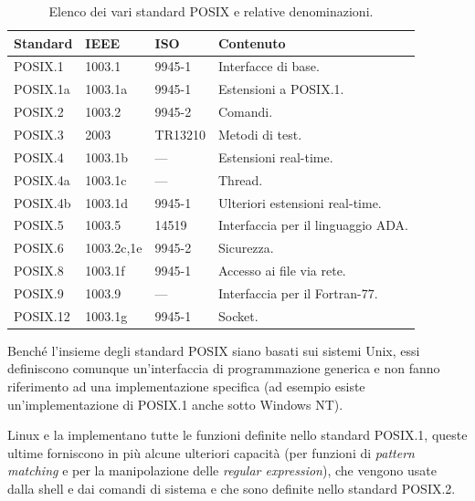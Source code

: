 \begin{table}[htb]
  \footnotesize
  \centering
  \begin{tabular}[c]{|l|l|l|l|}
    \hline
    \textbf{Standard} & \textbf{IEEE} & \textbf{ISO} & \textbf{Contenuto} \\
    \hline
    \hline
    POSIX.1 & 1003.1 & 9945-1& Interfacce di base.                          \\
    POSIX.1a& 1003.1a& 9945-1& Estensioni a POSIX.1.                        \\
    POSIX.2 & 1003.2 & 9945-2& Comandi.                                     \\
    POSIX.3 & 2003   &TR13210& Metodi di test.                              \\
    POSIX.4 & 1003.1b &  --- & Estensioni real-time.                        \\
    POSIX.4a& 1003.1c &  --- & Thread.                                      \\
    POSIX.4b& 1003.1d &9945-1& Ulteriori estensioni real-time.              \\
    POSIX.5 & 1003.5  & 14519& Interfaccia per il linguaggio ADA.           \\
    POSIX.6 & 1003.2c,1e& 9945-2& Sicurezza.                                \\
    POSIX.8 & 1003.1f& 9945-1& Accesso ai file via rete.                    \\
    POSIX.9 & 1003.9  &  --- & Interfaccia per il Fortran-77.               \\
    POSIX.12& 1003.1g& 9945-1& Socket.                                      \\
    \hline
  \end{tabular}
  \caption{Elenco dei vari standard POSIX e relative denominazioni.}
  \label{tab:intro_posix_std}
\end{table}

Benché l'insieme degli standard POSIX siano basati sui sistemi Unix, essi
definiscono comunque un'interfaccia di programmazione generica e non fanno
riferimento ad una implementazione specifica (ad esempio esiste
un'implementazione di POSIX.1 anche sotto Windows NT).  

Linux e la  implementano tutte le funzioni definite nello standard
POSIX.1, queste ultime forniscono in più alcune ulteriori capacità (per
funzioni di \textit{pattern matching} e per la manipolazione delle
\textit{regular expression}), che vengono usate dalla shell e dai comandi di
sistema e che sono definite nello standard POSIX.2.

